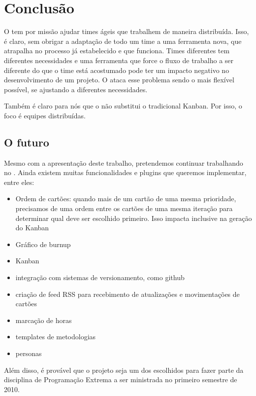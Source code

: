 \section{Conclusão}

O \calopsita{} tem por missão ajudar times ágeis que trabalhem de maneira distribuída. Isso, é claro, sem obrigar
a adaptação de todo um time a uma ferramenta nova, que atrapalha no processo já estabelecido e que funciona. Times
diferentes tem diferentes necessidades e uma ferramenta que force o fluxo de trabalho a ser diferente do que o time 
está acostumado pode ter um impacto negativo no desenvolvimento de um projeto. O \calopsita{} ataca esse problema
sendo o mais flexível possível, se ajustando a diferentes necessidades.

Também é claro para nós que o \calopsita{} não substitui o tradicional Kanban. Por isso, o foco é equipes distribuídas.


\subsection{O futuro}

Mesmo com a apresentação deste trabalho, pretendemos continuar trabalhando no \calopsita{}. Ainda existem muitas funcionalidades
e plugins que queremos implementar, entre eles:

\begin{itemize}
	\item{Ordem de cartões: quando mais de um cartão de uma mesma prioridade, precisamos de uma ordem entre os cartões de uma
	mesma iteração para determinar qual deve ser escolhido primeiro. Isso impacta inclusive na geração do Kanban}
	\item{Gráfico de burnup}
	\item{Kanban}
	\item{integração com sistemas de versionamento, como github}
	\item{criação de feed RSS para recebimento de atualizações e movimentações de cartões}
	\item{marcação de horas}
	\item{templates de metodologias}
	\item{personas}
\end{itemize}

Além disso, é provável que o projeto seja um dos escolhidos para fazer parte da disciplina de Programação Extrema a ser
ministrada no primeiro semestre de 2010.